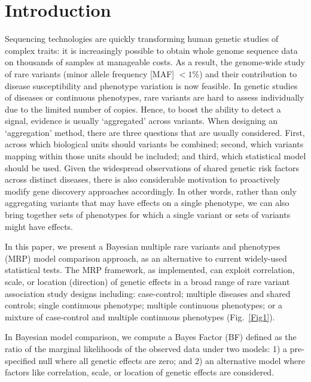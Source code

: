 \documentclass{nature}
\begin{document}
\section{Introduction} 
Sequencing technologies are quickly transforming human genetic studies of complex traits: it is increasingly possible to obtain whole genome sequence data on thousands of samples at manageable costs. As a result, the genome-wide study of rare variants (minor allele frequency [MAF] $< 1\%$) and their contribution to disease susceptibility and phenotype variation is now feasible\cite{ifih1,altshuler2010map,rivas2011deep,10002012integrated}. 
In genetic studies of diseases or continuous phenotypes, rare variants are hard to assess individually due to the limited number of copies. Hence, to boost the ability to detect a signal, evidence is usually `aggregated' across variants. When designing an `aggregation' method, there are three questions that are usually considered. First, across which biological units should variants be combined; second, which variants mapping within those units should be included\cite{majithia2014rare}; and third, which statistical model should be used\cite{lee2014rare}. Given the widespread observations of shared genetic risk factors across distinct diseases, there is also considerable motivation to proactively modify gene discovery approaches accordingly. In other words, rather than only aggregating variants that may have effects on a single phenotype, we can also bring together sets of phenotypes for which a single variant or sets of variants might have effects. 

In this paper, we present a Bayesian multiple rare variants and phenotypes (MRP) model comparison approach, as an alternative to current widely-used statistical tests. The MRP framework, as implemented, can exploit correlation, scale, or location (direction) of genetic effects in a broad range of rare variant association study designs including: case-control; multiple diseases and shared controls; single continuous phenotype; multiple continuous phenotypes; or a mixture of case-control and multiple continuous phenotypes (Fig.~\ref{Fig1}). 

In Bayesian model comparison, we compute a Bayes Factor (BF) defined as the ratio of the marginal likelihoods of the observed data under two models: 1) a pre-specified null where all genetic effects are zero; and 2) an alternative model where factors like correlation, scale, or location of genetic effects are considered. 
\end{document}
